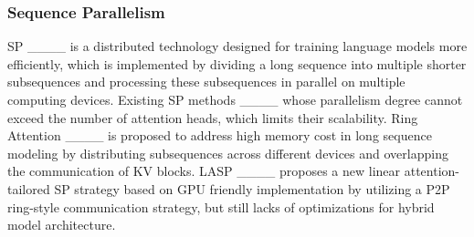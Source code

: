 \subsubsection{Sequence Parallelism}
SP ____ is a distributed technology designed for training language models more efficiently, which is implemented by dividing a long sequence into multiple shorter subsequences and processing these subsequences in parallel on multiple computing devices. Existing SP methods ____ whose parallelism degree cannot exceed the number of attention heads, which limits their scalability. Ring Attention ____ is proposed to address high memory cost in long sequence modeling by distributing subsequences across different devices and overlapping the communication of KV blocks. LASP ____ proposes a new linear attention-tailored SP strategy based on GPU friendly implementation by utilizing a P2P ring-style communication strategy, but still lacks of optimizations for hybrid model architecture.